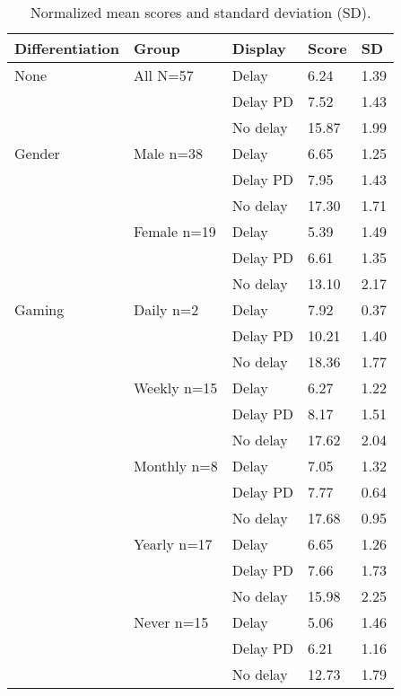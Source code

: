 \begin{table}[]
\small
\centering
\caption{Normalized mean scores and standard deviation (SD).}
\label{score}
\begin{tabularx}{\textwidth}{@{}XXXXX@{}}
\toprule
Differentiation & Group       & Display  & Score & SD \\ \midrule
None            & All N=57    & Delay    & 6.24  & 1.39               \\
                &             & Delay PD & 7.52  & 1.43               \\
                &             & No delay & 15.87 & 1.99               \\ \addlinespace
Gender          & Male n=38   & Delay    & 6.65  & 1.25               \\
                &             & Delay PD & 7.95  & 1.43               \\
                &             & No delay & 17.30 & 1.71               \\ \addlinespace
                & Female n=19 & Delay    & 5.39  & 1.49               \\
                &             & Delay PD & 6.61  & 1.35               \\
                &             & No delay & 13.10 & 2.17               \\ \addlinespace
Gaming          & Daily n=2   & Delay    & 7.92  & 0.37               \\
                &             & Delay PD & 10.21 & 1.40               \\
                &             & No delay & 18.36 & 1.77               \\ \addlinespace
                & Weekly n=15 & Delay    & 6.27  & 1.22               \\
                &             & Delay PD & 8.17  & 1.51               \\
                &             & No delay & 17.62 & 2.04               \\ \addlinespace
                & Monthly n=8 & Delay    & 7.05  & 1.32               \\
                &             & Delay PD & 7.77  & 0.64               \\
                &             & No delay & 17.68 & 0.95               \\ \addlinespace
                & Yearly n=17 & Delay    & 6.65  & 1.26               \\
                &             & Delay PD & 7.66  & 1.73               \\
                &             & No delay & 15.98 & 2.25               \\ \addlinespace
                & Never n=15  & Delay    & 5.06  & 1.46               \\
                &             & Delay PD & 6.21  & 1.16               \\
                &             & No delay & 12.73 & 1.79               \\ \bottomrule
\end{tabularx}
\end{table}
